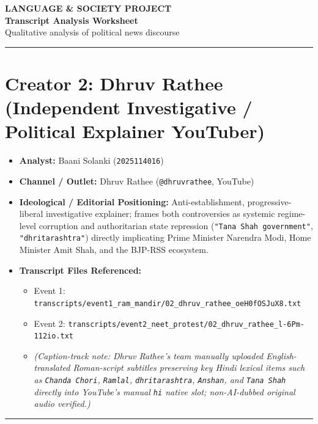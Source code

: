 \documentclass[10pt,a4paper]{article}
\begin{document}
\clearpage

\begin{center}
    {\large\bfseries LANGUAGE \& SOCIETY PROJECT}\\[3pt]
    {\LARGE\bfseries Transcript Analysis Worksheet}\\[3pt]
    {\normalsize Qualitative analysis of political news discourse}
\end{center}
\vspace{2pt}
\noindent\rule{\textwidth}{0.4pt}
\vspace{4pt}


\section*{Creator 2: Dhruv Rathee (Independent Investigative / Political Explainer YouTuber)}
\begin{itemize}[leftmargin=1.5em, itemsep=3pt, topsep=4pt]
  \item \textbf{Analyst:} Baani Solanki (\texttt{2025114016})
  \item \textbf{Channel / Outlet:} Dhruv Rathee (\texttt{@dhruvrathee}, YouTube)
  \item \textbf{Ideological / Editorial Positioning:} Anti-establishment, progressive-liberal investigative explainer; frames both controversies as systemic regime-level corruption and authoritarian state repression (\texttt{"Tana Shah government"}, \texttt{"dhritarashtra"}) directly implicating Prime Minister Narendra Modi, Home Minister Amit Shah, and the BJP-RSS ecosystem.
  \item \textbf{Transcript Files Referenced:}
  \begin{itemize}[leftmargin=1.4em, itemsep=2pt, topsep=2pt]
    \item Event 1: \texttt{transcripts/event1\_ram\_mandir/02\_dhruv\_rathee\_oeH0fOSJuX8.txt}
    \item Event 2: \texttt{transcripts/event2\_neet\_protest/02\_dhruv\_rathee\_l-6Pm-112io.txt}
    \item \textit{(Caption-track note: Dhruv Rathee's team manually uploaded English-translated Roman-script subtitles preserving key Hindi lexical items such as \texttt{Chanda Chori}, \texttt{Ramlal}, \texttt{dhritarashtra}, \texttt{Anshan}, and \texttt{Tana Shah} directly into YouTube's manual \texttt{hi} native slot; non-AI-dubbed original audio verified.)}
  \end{itemize}
\end{itemize}
\vspace{4pt}\noindent\rule{\textwidth}{0.4pt}\vspace{4pt}
\end{document}
